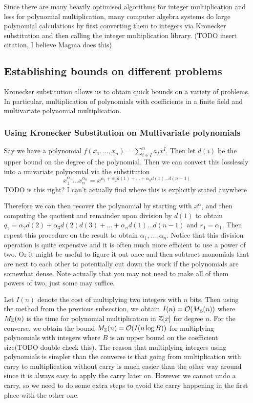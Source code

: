 Since there are many heavily optimised algorithms for integer multiplication and less for polynomial multiplication, many computer algebra systems do large polynomial calculations by first converting them to integers via Kronecker substitution and then calling the integer multiplication library. (TODO insert citation, I believe Magma does this)

\subsection{Establishing bounds on different problems}%
\label{sub:Establishing bounds on different problems}

Kronecker substitution allows us to obtain quick bounds on a variety of problems. In particular, multiplication of polynomials with coefficients in a finite field and multivariate polynomial multiplication.


\subsubsection{Using Kronecker Substitution on Multivariate polynomials}

Say we have a polynomial $f(x_1, \ldots, x_n) = \sum^n_{i \in I}a_Ix^I$. Then let $d(i)$ be the upper bound on the degree of the polynomial. Then we can convert this losslessly into a univariate polynomial via the substitution
\[
    x_1^{\alpha_1}\ldots x_n^{\alpha_n} = x^{\alpha_1 + \alpha_2d(1) + \ldots + \alpha_n d(1)\ldots d(n-1)}
\]
TODO is this right? I can't actually find where this is explicitly stated anywhere

Therefore we can then recover the polynomial by starting with $x^\alpha$, and then computing the quotient and remainder upon division by $d(1)$ to obtain $q_1 = \alpha_2d(2) + \alpha_3 d(2)d(3) + \ldots + \alpha_n d(1) \ldots d(n-1)$ and $r_1 = \alpha_1$. Then repeat this procedure on the result to obtain $\alpha_1, \ldots, \alpha_n$. Notice that this division operation is quite expensive and it is often much more efficient to use a power of two. Or it might be useful to figure it out once and then subtract monomials that are next to each other to potentially cut down the work if the polynomials are somewhat dense.
Note actually that you may not need to make all of them powers of two, just some may suffice.  




Let $I(n)$ denote the cost of multiplying two integers with $n$ bits. Then using the method from the previous subsection, we obtain $I(n) = \mathcal O(M_{\mathbb Z}(n))$ where $M_{\mathbb Z}(n)$ is the time for polynomial multiplication in ${\mathbb Z}[x]$ for degree $n$. For the converse, we obtain the bound $M_{\mathbb Z}(n) = \mathcal O(I(n\log B))$ for multiplying polynomials with integers where $B$ is an upper bound on the coefficient size(TODO double check this). The reason that multiplying integers using polynomials is simpler than the converse is that going from multiplication with carry to multiplication without carry is much easier than the other way around since it is always easy to apply the carry later on. However we cannot undo a carry, so we need to do some extra steps to avoid the carry happening in the first place with the other one.

